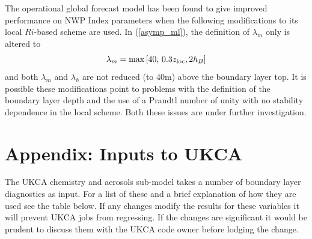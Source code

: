 \documentclass{UMDP_article}
\begin{document}
The operational global forecast model has been found to give improved
performance on NWP Index parameters when the following modifications
to its local $Ri$-based scheme are used.  In (\ref{asymp_ml}), the
definition of $\lambda_m$ only is altered to
\begin{equation*}
  \lambda_m = \mbox{max}\left[40,\, 0.3 z_{\rm loc}, 2 h_B \right]
\end{equation*}
and both $\lambda_m$ and $\lambda_h$ are not reduced (to 40m) above
the boundary layer top.  It is possible these modifications point to
problems with the definition of the boundary layer depth and the use
of a Prandtl number of unity with no stability dependence in the local
scheme.  Both these issues are under further investigation.

\newpage
\section{Appendix: Inputs to UKCA}

The UKCA chemistry and aerosols sub-model takes a number of boundary
layer diagnostics as input. For a list of these and a brief
explanation of how they are used see the table below.  If any changes
modify the results for these variables it will prevent UKCA jobs from
regressing. If the changes are significant it would be prudent to
discuss them with the UKCA code owner before lodging the change.
\end{document}
